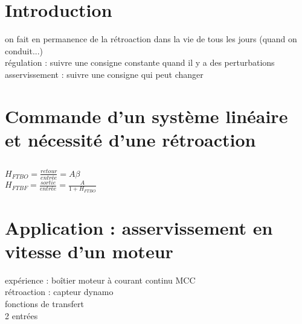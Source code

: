 


\biblio{}

\section*{Introduction}
on fait en permanence de la rétroaction dans la vie de tous les jours (quand on conduit...) \\
régulation : suivre une consigne constante quand il y a des perturbations \\
asservissement : suivre une consigne qui peut changer \\


\section{Commande d'un système linéaire et nécessité d'une rétroaction}
\subsection{}
\subsection{}

$H_{FTBO}=\frac{retour}{entrée}=A \beta $ \\
$H_{FTBF}=\frac{sortie}{entrée}=\frac{A}{1+H_{FTBO}}$ \\

\section{Application : asservissement en vitesse d'un moteur}
expérience : boîtier moteur à courant continu MCC\\
rétroaction : capteur dynamo \\
fonctions de transfert \\
2 entrées \\

